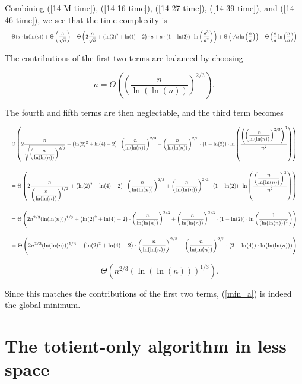 \documentclass[12pt]{article}
\newcommand{\eqn}[1]{\begin{displaymath} #1 \end{displaymath}}
\newcommand{\neqn}[1]{\begin{equation} #1 \end{equation}}
\newcommand{\tweqn}[1]{\begin{displaymath}\resizebox{\textwidth}{!}{$\displaystyle #1 $}\end{displaymath}}
\begin{document}
Combining (\ref{14-M-time}), (\ref{14-16-time}), (\ref{14-27-time}), (\ref{14-39-time}), and (\ref{14-46-time}), we see that the time complexity is
\tweqn{
\Theta( a \cdot \ln(\ln(a))
+
\Theta\left(\frac{n}{\sqrt{a}}\right)
+
\Theta\left( 2\frac{n}{\sqrt{a}} + \left(\ln(2)^2 + \ln(4) - 2\right) \cdot a + a \cdot (1 - \ln(2)) \cdot \ln\left(\frac{a^3}{n^2}\right) \right)
+
\Theta\left( \sqrt{n} \ln\left(\frac{n}{a}\right) \right)
+
\Theta\left( \frac{n}{a} \ln\left(\frac{n}{a}\right) \right)
}

The contributions of the first two terms are balanced by choosing

\neqn{a = \Theta\left(\left(\frac{n}{\ln(\ln(n))}\right)^{2/3}\right). \label{min_a}}

The fourth and fifth terms are then neglectable, and the third term becomes

\tweqn{\Theta\left( 2\frac{n}{\sqrt{\left(\dfrac{n}{\ln(\ln(n))}\right)^{2/3}}} + \left(\ln(2)^2 + \ln(4) - 2\right) \cdot \left(\frac{n}{\ln(\ln(n))}\right)^{2/3} + \left(\frac{n}{\ln(\ln(n))}\right)^{2/3} \cdot (1 - \ln(2)) \cdot \ln\left(\frac{\left(\left(\dfrac{n}{\ln(\ln(n))}\right)^{2/3}\right)^3}{n^2}\right) \right)}

\tweqn{= \Theta\left( 2\frac{n}{\left(\dfrac{n}{\ln(\ln(n))}\right)^{1/3}} + \left(\ln(2)^2 + \ln(4) - 2\right) \cdot \left(\frac{n}{\ln(\ln(n))}\right)^{2/3} + \left(\frac{n}{\ln(\ln(n))}\right)^{2/3} \cdot (1 - \ln(2)) \cdot \ln\left(\frac{\left(\dfrac{n}{\ln(\ln(n))}\right)^2}{n^2}\right) \right)}

\tweqn{= \Theta\left( 2 n^{2/3} (\ln(\ln(n)))^{1/3} + \left(\ln(2)^2 + \ln(4) - 2\right) \cdot \left(\frac{n}{\ln(\ln(n))}\right)^{2/3} + \left(\frac{n}{\ln(\ln(n))}\right)^{2/3} \cdot (1 - \ln(2)) \cdot \ln\left(\frac{1}{(\ln(\ln(n)))^2}\right) \right)}

\tweqn{= \Theta\left( 2 n^{2/3} (\ln(\ln(n)))^{1/3} + \left(\ln(2)^2 + \ln(4) - 2\right) \cdot \left(\frac{n}{\ln(\ln(n))}\right)^{2/3} - \left(\frac{n}{\ln(\ln(n))}\right)^{2/3} \cdot (2 - \ln(4)) \cdot \ln(\ln(\ln(n))) \right)}

\eqn{= \Theta\left( n^{2/3} (\ln(\ln(n)))^{1/3} \right).}

Since this matches the contributions of the first two terms, (\ref{min_a}) is indeed the global minimum.

\section{The totient-only algorithm in less space}
\end{document}
